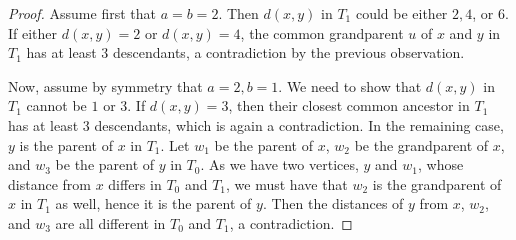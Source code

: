 \documentclass[10pt,a4paper]{amsart}
\begin{document}
\begin{proof}
Assume first that $a=b=2$. Then $d(x,y)$ in $T_1$ could be either $2,4$, or $6$. If either $d(x,y)=2$ or $d(x,y)=4$, the common grandparent $u$ of $x$ and $y$ in $T_1$ has at least $3$ descendants, a contradiction by the previous observation.

Now, assume by symmetry that $a=2, b=1$. We need to show that $d(x,y)$ in $T_1$ cannot be $1$ or $3$. If $d(x,y)=3$, then their closest common ancestor in $T_1$ has at least $3$ descendants, which is again a contradiction. In the remaining case, $y$ is the parent of $x$ in $T_1$. Let $w_1$ be the parent of $x$, $w_2$ be the grandparent of $x$, and $w_3$ be the parent of $y$ in $T_0$. As we have two vertices, $y$ and $w_1$, whose distance from $x$ differs in $T_0$ and $T_1$, we must have that $w_2$ is the grandparent of $x$ in $T_1$ as well, hence it is the parent of $y$. Then the distances of $y$ from $x$, $w_2$, and $w_3$ are all different in $T_0$ and $T_1$, a contradiction.
\end{proof}
\end{document}
